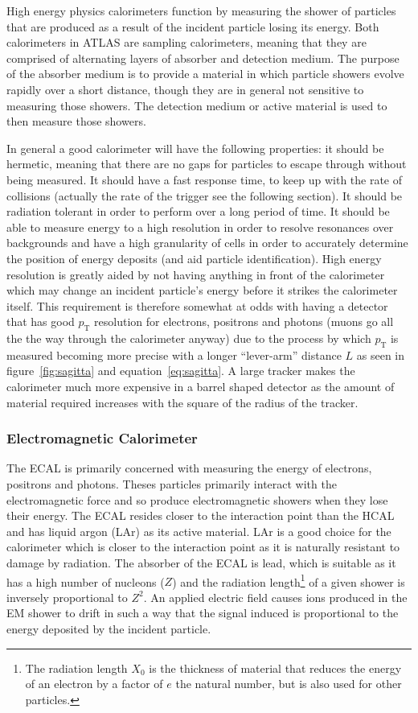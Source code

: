 High energy physics calorimeters function by measuring the shower
of particles that are produced as a result of the incident particle losing its
energy. Both calorimeters in ATLAS are sampling calorimeters, meaning that they
are comprised of alternating layers of absorber and detection medium. The purpose
of the absorber medium is to provide a material in which particle showers evolve
rapidly over a short distance, though they are in general not sensitive to
measuring those showers. The detection medium or active material is used to then
measure those showers.

In general a good calorimeter will have the following properties: it should be
hermetic, meaning that there are no gaps for particles to escape through without
being measured. It should have a fast response time, to keep up with the rate of
collisions (actually the rate of the trigger see the following section). It
should be radiation tolerant in order to perform over a long period of time. It
should be able to measure energy to a high resolution in order to resolve
resonances over backgrounds and have a high granularity of cells in order to
accurately determine the position of energy deposits (and aid particle
identification). High energy resolution is greatly aided by not having anything
in front of the calorimeter which may change an incident particle's energy
before it strikes the calorimeter itself. This requirement is therefore somewhat
at odds with having a detector that has good $p_{\mathrm{T}}$ resolution for
electrons, positrons and photons (muons go all the the way through the
calorimeter anyway) due to the process by which $p_{\mathrm{T}}$ is measured
becoming more precise with a longer ``lever-arm'' distance $L$ as seen in
figure~\ref{fig:sagitta} and equation~\ref{eq:sagitta}. A large tracker makes
the calorimeter much more expensive in a barrel shaped detector as the amount of
material required increases with the square of the radius of the tracker.

\subsubsection{Electromagnetic Calorimeter}
The ECAL is primarily concerned with measuring the energy of electrons,
positrons and photons. Theses particles primarily interact with the
electromagnetic force and so produce electromagnetic showers when they lose
their energy. The ECAL resides closer to the interaction point than the HCAL and
has liquid argon (LAr) as its active material. LAr is a good choice for the
calorimeter which is closer to the interaction point as it is naturally
resistant to damage by radiation. The absorber of the ECAL is lead, which is
suitable as it has a high number of nucleons ($Z$) and the radiation
length\footnote{The radiation length $X_{0}$ is the thickness of material that
reduces the energy of an electron by a factor of $e$ the natural number, but is
also used for other particles.} of a given shower is inversely proportional to
$Z^2$. An applied electric field causes ions produced in the EM shower to drift
in such a way that the signal induced is proportional to the energy deposited by
the incident particle.

